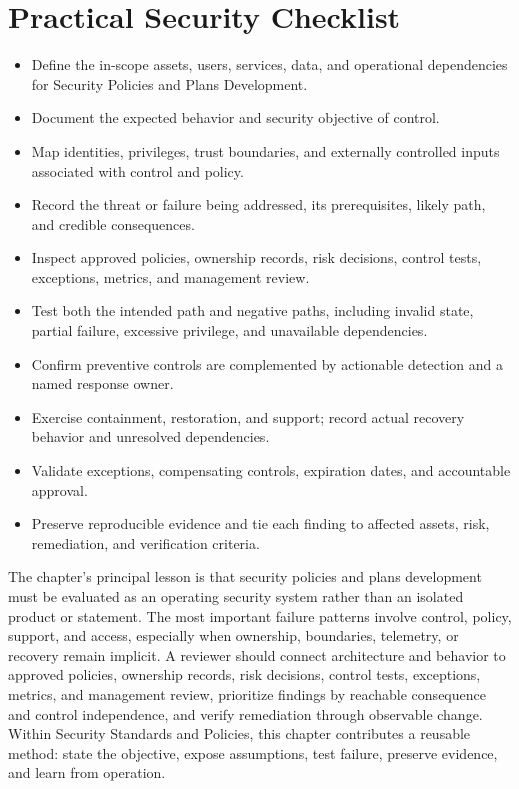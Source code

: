 \documentclass[11pt]{article}
\begin{document}
\section*{Practical Security Checklist}
\begin{itemize}[label=$\square$]
\item Define the in-scope assets, users, services, data, and operational dependencies for Security Policies and Plans Development.
\item Document the expected behavior and security objective of control.
\item Map identities, privileges, trust boundaries, and externally controlled inputs associated with control and policy.
\item Record the threat or failure being addressed, its prerequisites, likely path, and credible consequences.
\item Inspect approved policies, ownership records, risk decisions, control tests, exceptions, metrics, and management review.
\item Test both the intended path and negative paths, including invalid state, partial failure, excessive privilege, and unavailable dependencies.
\item Confirm preventive controls are complemented by actionable detection and a named response owner.
\item Exercise containment, restoration, and support; record actual recovery behavior and unresolved dependencies.
\item Validate exceptions, compensating controls, expiration dates, and accountable approval.
\item Preserve reproducible evidence and tie each finding to affected assets, risk, remediation, and verification criteria.
\end{itemize}
\begin{synthesisbox}
The chapter's principal lesson is that security policies and plans development must be evaluated as an operating security system rather than an isolated product or statement. The most important failure patterns involve control, policy, support, and access, especially when ownership, boundaries, telemetry, or recovery remain implicit. A reviewer should connect architecture and behavior to approved policies, ownership records, risk decisions, control tests, exceptions, metrics, and management review, prioritize findings by reachable consequence and control independence, and verify remediation through observable change. Within Security Standards and Policies, this chapter contributes a reusable method: state the objective, expose assumptions, test failure, preserve evidence, and learn from operation.
\end{synthesisbox}
\end{document}
